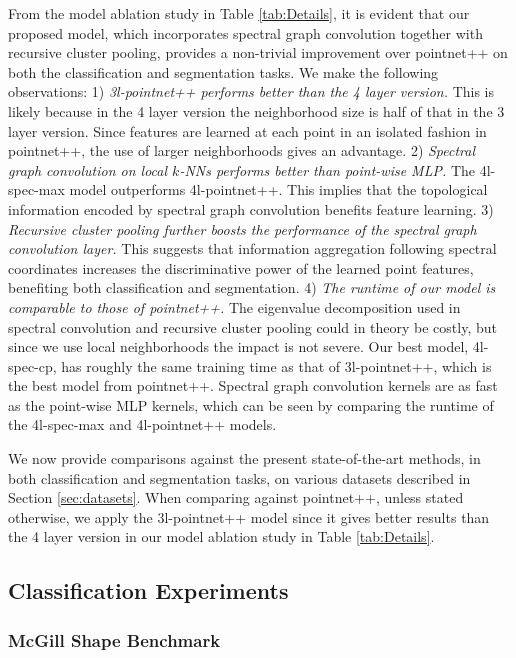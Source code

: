 \documentclass[runningheads]{llncs}
\begin{document}
From the model ablation study in Table \ref{tab:Details}, it is evident that our proposed model, which incorporates spectral graph convolution together with recursive cluster pooling, provides a non-trivial improvement over pointnet++ on both the classification and segmentation tasks. We make the following observations:
1) {\em 3l-pointnet++ performs better than the 4 layer version.} This is likely because in the 4 layer version the neighborhood size is half of that in the 3 layer version. Since features are learned at each point in an isolated fashion in pointnet++, the use of larger neighborhoods gives an advantage.
2) {\em Spectral graph convolution on local $k$-NNs performs better than point-wise MLP.} The 4l-spec-max model outperforms 4l-pointnet++. This implies that the topological information encoded by spectral graph convolution benefits feature learning.
3) {\em Recursive cluster pooling further boosts the performance of the spectral graph convolution layer.} This suggests that information aggregation following spectral coordinates increases the discriminative power of the learned point features, benefiting both classification and segmentation.
4) {\em The runtime of our model is comparable to those of pointnet++.} The eigenvalue decomposition used in spectral convolution and recursive cluster pooling could in theory be costly, but since we use local neighborhoods the impact is not severe. Our best model, 4l-spec-cp, has roughly the same training time as that of 3l-pointnet++, which is the best model from pointnet++. Spectral graph convolution kernels are as fast as the point-wise MLP kernels, which can be seen by comparing the runtime of the 4l-spec-max and 4l-pointnet++ models.


We now provide comparisons against the present state-of-the-art methods, in both classification and segmentation tasks, on
various datasets described in Section \ref{sec:datasets}. When comparing against pointnet++, unless stated otherwise, we apply the 3l-pointnet++ model since it gives better results than the 4 layer version in our model ablation study in Table \ref{tab:Details}.


\subsection{Classification Experiments}

\subsubsection{McGill Shape Benchmark}\label{sec:exp_mcgill}
\end{document}
